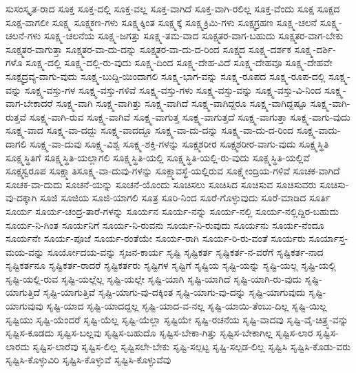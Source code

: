 {ಸುಸಂಸ್ಕೃತ-ರಾದ
ಸೂಕ್ತ
ಸೂಕ್ತ-ದಲ್ಲಿ
ಸೂಕ್ತ-ವಲ್ಲ
ಸೂಕ್ತ-ವಾಗಿದೆ
ಸೂಕ್ತ-ವಾಗಿ-ರಲಿಲ್ಲ
ಸೂಕ್ತ-ವೆಂದು
ಸೂಕ್ಷ
ಸೂಕ್ಷದ
ಸೂಕ್ಷ-ವಾಗಲೀ
ಸೂಕ್ಷ್ಮ
ಸೂಕ್ಷ್ಮಕಣ-ಗಳು
ಸೂಕ್ಷ್ಮಕ್ಕಿಂತ
ಸೂಕ್ಷ್ಮಕ್ಕೆ
ಸೂಕ್ಷ್ಮಕ್ರಿಮಿ-ಗಳು
ಸೂಕ್ಷ್ಮಗ್ರಹಣ
ಸೂಕ್ಷ್ಮ-ಚಲನೆ
ಸೂಕ್ಷ್ಮ-ಚಲನೆ-ಗಳು
ಸೂಕ್ಷ್ಮ-ಚಲನೆಯ
ಸೂಕ್ಷ್ಮ-ಜಗತ್ತು
ಸೂಕ್ಷ್ಮ-ತಮ-ವಾದ
ಸೂಕ್ಷ್ಮತರ-ವಾಗ-ಬಹುದು
ಸೂಕ್ಷ್ಮತರ-ವಾಗ-ಬೇಕು
ಸೂಕ್ಷ್ಮತರ-ವಾಗುತ್ತಾ
ಸೂಕ್ಷ್ಮತರ-ವಾ-ದು-ದನ್ನು
ಸೂಕ್ಷ್ಮತರ-ವಾ-ದು-ದ-ರಿಂದ
ಸೂಕ್ಷ್ಮದ
ಸೂಕ್ಷ್ಮ-ದರ್ಶಕ
ಸೂಕ್ಷ್ಮ-ದರ್ಶಿ-ಗಳೊ
ಸೂಕ್ಷ್ಮ-ದಲ್ಲಿ
ಸೂಕ್ಷ್ಮ-ದಲ್ಲಿ-ರು-ವುದು
ಸೂಕ್ಷ್ಮ-ದಿಂದ
ಸೂಕ್ಷ್ಮ-ದೇಹ-ವಿದೆ
ಸೂಕ್ಷ್ಮ-ದೇಹವೂ
ಸೂಕ್ಷ್ಮ-ದೇಹವೇ
ಸೂಕ್ಷ್ಮದ್ರವ್ಯ-ವಾಗು-ವುದು
ಸೂಕ್ಷ್ಮ-ಬುದ್ದಿ-ಯಿಂದಾಗಲಿ
ಸೂಕ್ಷ್ಮ-ಭಾಗ-ವನ್ನು
ಸೂಕ್ಷ್ಮ-ರೂಪದ
ಸೂಕ್ಷ್ಮ-ರೂಪ-ದಲ್ಲಿ
ಸೂಕ್ಷ್ಮ-ವನ್ನು
ಸೂಕ್ಷ್ಮ-ವಸ್ತು-ಗಳ
ಸೂಕ್ಷ್ಮ-ವಸ್ತು-ಗಳಿವೆ
ಸೂಕ್ಷ್ಮ-ವಸ್ತು-ಗಳು
ಸೂಕ್ಷ್ಮ-ವಸ್ತು-ವನ್ನು
ಸೂಕ್ಷ್ಮ-ವಸ್ತು-ವಿ-ನಿಂದ
ಸೂಕ್ಷ್ಮ-ವಾಗ-ಬೇಕಾದರೆ
ಸೂಕ್ಷ್ಮ-ವಾಗಿ
ಸೂಕ್ಷ್ಮ-ವಾಗಿತ್ತು
ಸೂಕ್ಷ್ಮ-ವಾಗಿದೆ
ಸೂಕ್ಷ್ಮ-ವಾಗಿದ್ದರೂ
ಸೂಕ್ಷ್ಮ-ವಾಗಿದ್ದಷ್ಟೂ
ಸೂಕ್ಷ್ಮ-ವಾಗಿ-ರುತ್ತವೆ
ಸೂಕ್ಷ್ಮ-ವಾಗಿ-ರುವ
ಸೂಕ್ಷ್ಮ-ವಾಗಿವೆ
ಸೂಕ್ಷ್ಮ-ವಾಗುತ್ತ
ಸೂಕ್ಷ್ಮ-ವಾಗುತ್ತದೆ
ಸೂಕ್ಷ್ಮ-ವಾಗುತ್ತಾ
ಸೂಕ್ಷ್ಮ-ವಾಗು-ವುದು
ಸೂಕ್ಷ್ಮ-ವಾದ
ಸೂಕ್ಷ್ಮ-ವಾ-ದದ್ದು
ಸೂಕ್ಷ್ಮ-ವಾದದ್ದೂ
ಸೂಕ್ಷ್ಮ-ವಾ-ದು-ದನ್ನು
ಸೂಕ್ಷ್ಮ-ವಾ-ದು-ದ-ರಿಂದ
ಸೂಕ್ಷ್ಮ-ವಾದು-ದಾಗಲಿ
ಸೂಕ್ಷ್ಮ-ವಾ-ದುವು
ಸೂಕ್ಷ್ಮ-ವಿಶ್ವ
ಸೂಕ್ಷ್ಮ-ಶಕ್ತಿ-ಗಳನ್ನು
ಸೂಕ್ಷ್ಮಶರೀರ
ಸೂಕ್ಷ್ಮಶರೀರ-ವಾಗು-ವುದು
ಸೂಕ್ಷ್ಮಸ್ಥಿತಿ
ಸೂಕ್ಷ್ಮಸ್ಥಿತಿಗೆ
ಸೂಕ್ಷ್ಮಸ್ಥಿತಿ-ಯಲ್ಲಾಗಲಿ
ಸೂಕ್ಷ್ಮಸ್ಥಿತಿ-ಯಲ್ಲಿ
ಸೂಕ್ಷ್ಮಸ್ಥಿತಿ-ಯಲ್ಲಿ-ರು-ವುದು
ಸೂಕ್ಷ್ಮಸ್ಥಿತಿ-ಯಲ್ಲಿವೆ
ಸೂಕ್ಷ್ಮಸ್ವರೂಪ
ಸೂಕ್ಷ್ಮಾತಿಸೂಕ್ಷ್ಮ-ವಾ-ದುವು-ಗಳನ್ನು
ಸೂಕ್ಷ್ಮಾವಸ್ಥೆ-ಯಲ್ಲಿರುವ
ಸೂಕ್ಷ್ಮೇಂದ್ರಿಯ-ಗಳಿವೆ
ಸೂಚಕ-ವಾಗಿದೆ
ಸೂಚಕ-ವಾ-ದುದು
ಸೂಚನೆ-ಯನ್ನು
ಸೂಚನೆ-ಯೊಂದು
ಸೂಚಿಸಲು
ಸೂಚಿಸಿದ
ಸೂಚಿಸುವ
ಸೂಚಿಸುವರು
ಸೂಚಿಸು-ವು-ದಕ್ಕಾಗಿ
ಸೂಜಿ
ಸೂಜಿಯ
ಸೂಜಿ-ಯಾಗಲಿ
ಸೂತ್ರ
ಸೂರಿ-ನಿಂದ
ಸೂರೆ-ಗೊಳ್ಳುವುದು
ಸೂರೆ-ಮಾಡಿದ
ಸೂರ್ತಿ
ಸೂರ್ಯ
ಸೂರ್ಯ-ಚಂದ್ರ-ತಾರೆ-ಗಳನ್ನು
ಸೂರ್ಯನ
ಸೂರ್ಯ-ನನ್ನು
ಸೂರ್ಯ-ನಲ್ಲಿ
ಸೂರ್ಯ-ನಲ್ಲಿದ್ದಿರ-ಬಹುದು
ಸೂರ್ಯ-ನಿ-ಗಿಂತ
ಸೂರ್ಯನಿಗೆ
ಸೂರ್ಯ-ನಿ-ರುವನು
ಸೂರ್ಯ-ನಿ-ರುವುದು
ಸೂರ್ಯನು
ಸೂರ್ಯ-ನೆಂದೂ
ಸೂರ್ಯನೇ
ಸೂರ್ಯ-ಪೂಜೆ
ಸೂರ್ಯ-ರಂತೆಯೇ
ಸೂರ್ಯ-ರಾಗಿ
ಸೂರ್ಯ-ರಿ-ರು-ವಂತೆ
ಸೂರ್ಯರು
ಸೂರ್ಯಾಸ್ತ-ಮಯ-ವನ್ನು
ಸೂರ್ಯೋದಯ-ವನ್ನು
ಸೃಜನ-ಕಾರ್ಯ
ಸೃಷ್ಟಿ
ಸೃಷ್ಟಿಕರ್ತ
ಸೃಷ್ಟಿಕರ್ತ-ನ-ವರೆಗೆ
ಸೃಷ್ಟಿಕರ್ತ-ನಾದ
ಸೃಷ್ಟಿಕರ್ತನೂ
ಸೃಷ್ಟಿಕರ್ತ-ರಾದರೆ
ಸೃಷ್ಟಿಕರ್ತರು
ಸೃಷ್ಟಿಗಳ
ಸೃಷ್ಟಿಗೆ
ಸೃಷ್ಟಿಯ
ಸೃಷ್ಟಿ-ಯನ್ನು
ಸೃಷ್ಟಿ-ಯಲ್ಲ
ಸೃಷ್ಟಿ-ಯಲ್ಲಿ
ಸೃಷ್ಟಿ-ಯಲ್ಲಿ-ರುವ
ಸೃಷ್ಟಿ-ಯಲ್ಲೆಲ್ಲ
ಸೃಷ್ಟಿ-ಯಲ್ಲೇ
ಸೃಷ್ಟಿ-ಯಾಗಿ
ಸೃಷ್ಟಿ-ಯಾಗಿದೆ
ಸೃಷ್ಟಿ-ಯಾಗಿ-ರು-ವುದು
ಸೃಷ್ಟಿ-ಯಾಗುತ್ತಿದೆ
ಸೃಷ್ಟಿ-ಯಾಗುತ್ತಿವೆ
ಸೃಷ್ಟಿ-ಯಾಗು-ವು-ದಕ್ಕಿಂತ
ಸೃಷ್ಟಿ-ಯಾಗು-ವು-ದನ್ನು
ಸೃಷ್ಟಿ-ಯಾಗುವುದು
ಸೃಷ್ಟಿ-ಯಾಗುವುವು
ಸೃಷ್ಟಿ-ಯಾದ
ಸೃಷ್ಟಿ-ಯಾದದ್ದಲ್ಲ
ಸೃಷ್ಟಿ-ಯಾದ-ವ-ನಲ್ಲ
ಸೃಷ್ಟಿ-ಯಾಯಿ-ತೆಂಬು-ದಿಲ್ಲ
ಸೃಷ್ಟಿ-ಯಿಲ್ಲ
ಸೃಷ್ಟಿಯು
ಸೃಷ್ಟಿ-ಯೆಂದರೆ
ಸೃಷ್ಟಿ-ಯೆಲ್ಲ
ಸೃಷ್ಟಿ-ಯೆಲ್ಲಾ
ಸೃಷ್ಟಿಯೇ
ಸೃಷ್ಟಿ-ರಚನೆಯ
ಸೃಷ್ಟಿ-ವಾದವು
ಸೃಷ್ಟಿ-ವೈ-ಚಿತ್ರ್ಯ-ವನ್ನು
ಸೃಷ್ಟಿಸ-ಕೂಡದು
ಸೃಷ್ಟಿಸ-ಬಲ್ಲವು
ಸೃಷ್ಟಿಸ-ಬಹುದೊ
ಸೃಷ್ಟಿಸ-ಬೇಕಾ-ಗಿತ್ತು
ಸೃಷ್ಟಿಸ-ಬೇಕಾಗಿಲ್ಲ
ಸೃಷ್ಟಿಸ-ಲಾರ
ಸೃಷ್ಟಿಸ-ಲಾರದು
ಸೃಷ್ಟಿಸ-ಲಾರೆವು
ಸೃಷ್ಟಿಸ-ಲಿಲ್ಲ
ಸೃಷ್ಟಿಸಲೇ-ಬೇಕು
ಸೃಷ್ಟಿ-ಸಲ್ಪಟ್ಟ
ಸೃಷ್ಟಿ-ಸಲ್ಪಡ-ಲಿಲ್ಲ
ಸೃಷ್ಟಿಸಿ
ಸೃಷ್ಟಿಸಿ-ಕೊಡು-ವರು
ಸೃಷ್ಟಿಸಿ-ಕೊಳ್ಳುವಿರಿ
ಸೃಷ್ಟಿಸಿ-ಕೊಳ್ಳುವೆ
ಸೃಷ್ಟಿಸಿ-ಕೊಳ್ಳುವೆವು
}
